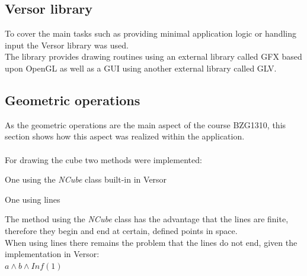 \documentclass[pdftex,12pt,a4paper]{article}
\begin{document}
\subsection{Versor library}

To cover the main tasks such as providing minimal application logic or handling input the Versor library was used.\\
The library provides drawing routines using an external library called \gls{GFX} based upon \gls{OpenGL} as well as a GUI using another external library called \gls{GLV}.
\newpage

\subsection{Geometric operations}

As the geometric operations are the main aspect of the course BZG1310, this section shows how this aspect was realized within the application.\\
\\
For drawing the cube two methods were implemented:
\begin{compactitem}
	\item One using the \textit{NCube} class built-in in Versor
	\item One using lines
\end{compactitem}
\vspace*{2mm}
\noindent\hspace*{0mm}The method using the \textit{NCube} class has the advantage that the lines are finite, therefore they begin and end at certain, defined points in space.\\
When using lines there remains the problem that the lines do not end, given the implementation in Versor:\vspace*{5mm}\\
\noindent\hspace*{10mm}\vspace*{5mm} $ a \wedge b \wedge Inf(1) $
\end{document}
